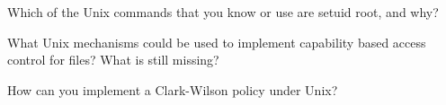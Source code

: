 \documentclass{supervision}
\begin{document}
\begin{questions}

    \question Which of the Unix commands that you know or use are setuid root,
      and why?

    \question What Unix mechanisms could be used to implement capability based
      access control for files? What is still missing?

    \question How can you implement a Clark-Wilson policy under Unix?
  \end{questions}
\end{document}
